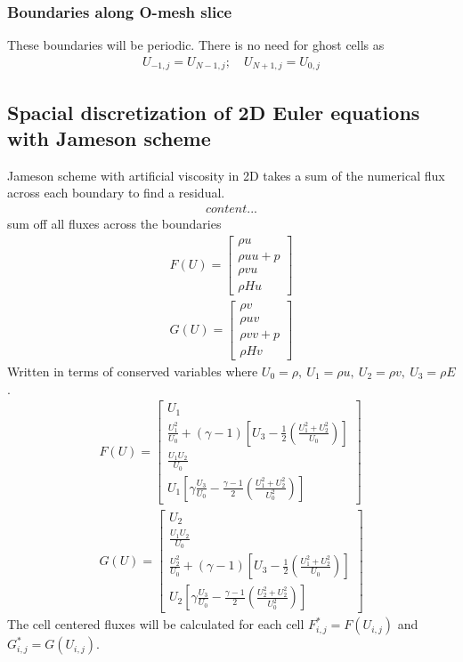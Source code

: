\documentclass[11pt]{article}
\begin{document}
		\subsubsection{Boundaries along O-mesh slice}
		These boundaries will be periodic. There is no need for ghost cells as
			\begin{align}
			U_{-1,j} = U_{N-1,j}; \quad U_{N+1,j} = U_{0,j}
			\end{align}
	\subsection{Spacial discretization of 2D Euler equations with Jameson scheme}
	Jameson scheme with artificial viscosity in 2D takes a sum of the numerical flux across each boundary to find a residual. 
		\begin{align}
		content...
		\end{align}
	sum off all fluxes across the boundaries
		\begin{align}
		F(U) = \begin{bmatrix}
		\rho u \\ \rho uu + p\\ \rho vu \\ \rho H u
		\end{bmatrix} \\
		G(U) = \begin{bmatrix}
		\rho v \\ \rho uv \\ \rho vv + p\\ \rho H v
		\end{bmatrix}
		\end{align}
	Written in terms of conserved variables where $U_0 = \rho,~U_1 = \rho u,~ U_2 = \rho v,~U_3 = \rho E$.
		\begin{align}
		F(U) = \begin{bmatrix} U_1 \\ 
		\frac{U_1^2}{U_0} + (\gamma - 1)\left[U_3 - \frac{1}{2} \left(\frac{U_1^2 + U_2^2}{U_0}\right)\right]\\ 
		\frac{U_1 U_2 }{U_0} \\
		U_1 \left[ \gamma \frac{U_3}{U_0} - \frac{\gamma - 1}{2} \left(\frac{U_1^2 + U_2^2}{U_0^2}\right)\right] \end{bmatrix} \\
		G(U)= \begin{bmatrix} U_2 \\ 
		\frac{U_1 U_2 }{U_0} \\
		\frac{U_2^2}{U_0} + (\gamma - 1)\left[U_3 - \frac{1}{2} \left(\frac{U_1^2 + U_2^2}{U_0}\right)\right]\\ 
		U_2 \left[ \gamma \frac{U_3}{U_0} - \frac{\gamma - 1}{2} \left(\frac{U_2^2 + U_2^2}{U_0^2}\right)\right] \end{bmatrix} 
		\end{align}
	The cell centered fluxes will be calculated for each cell $F_{i,j}^* = F(U_{i,j})$ and $G_{i,j}^* = G(U_{i,j})$.
\end{document}
